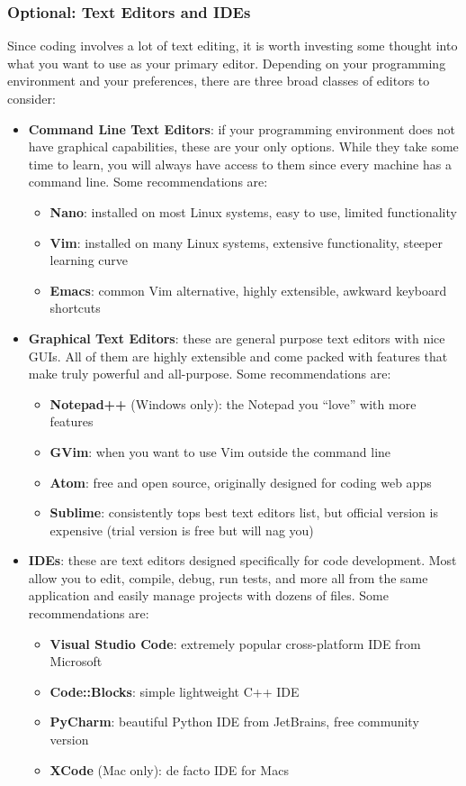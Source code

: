 \documentclass[12pt]{article}
\begin{document}
\subsubsection{Optional: Text Editors and IDEs}
Since coding involves a lot of text editing, it is worth investing some thought into what you want to use as your primary editor. Depending on your programming environment and your preferences, there are three broad classes of editors to consider:
\begin{itemize}
    \item \textbf{Command Line Text Editors}: if your programming environment does not have graphical capabilities, these are your only options. While they take some time to learn, you will always have access to them since every machine has a command line. Some recommendations are:
        \begin{itemize}
            \item \textbf{Nano}: installed on most Linux systems, easy to use, limited functionality
            \item \textbf{Vim}: installed on many Linux systems, extensive functionality, steeper learning curve
            \item \textbf{Emacs}: common Vim alternative, highly extensible, awkward keyboard shortcuts
        \end{itemize}
    \item \textbf{Graphical Text Editors}: these are general purpose text editors with nice GUIs. All of them are highly extensible and come packed with features that make truly powerful and all-purpose. Some recommendations are:
        \begin{itemize}
            \item \textbf{Notepad++} (Windows only): the Notepad you ``love'' with more features
            \item \textbf{GVim}: when you want to use Vim outside the command line
            \item \textbf{Atom}: free and open source, originally designed for coding web apps
            \item \textbf{Sublime}: consistently tops best text editors list, but official version is expensive (trial version is free but will nag you)
        \end{itemize}
    \item \textbf{IDEs}: these are text editors designed specifically for code development. Most allow you to edit, compile, debug, run tests, and more all from the same application and easily manage projects with dozens of files. Some recommendations are:
        \begin{itemize}
            \item \textbf{Visual Studio Code}: extremely popular cross-platform IDE from Microsoft
            \item \textbf{Code::Blocks}: simple lightweight C++ IDE
            \item \textbf{PyCharm}: beautiful Python IDE from JetBrains, free community version
            \item \textbf{XCode} (Mac only): de facto IDE for Macs
        \end{itemize}
\end{itemize}
\end{document}

